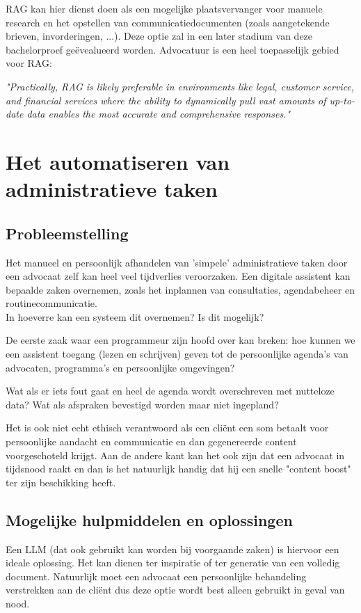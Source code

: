 RAG kan hier dienst doen als een mogelijke plaatsvervanger voor manuele research en het opstellen van communicatiedocumenten (zoals aangetekende brieven, invorderingen, ...). Deze optie zal in
een later stadium van deze bachelorproef geëvealueerd worden. Advocatuur is een heel toepasselijk gebied voor RAG:

\begin{displayquote}
	\textit{"Practically, RAG is likely preferable in environments like
		legal, customer service, and financial services where the ability to
		dynamically pull vast amounts of up-to-date data enables the most accurate and comprehensive responses."} \autocite{MediumRAG}
\end{displayquote}

\section{Het automatiseren van administratieve taken}
\subsection{Probleemstelling}
Het manueel en persoonlijk afhandelen van 'simpele' administratieve taken door een advocaat zelf kan heel veel tijdverlies veroorzaken.
Een digitale assistent kan bepaalde zaken overnemen, zoals het inplannen van consultaties, agendabeheer en routinecommunicatie. \\
In hoeverre kan een systeem dit overnemen? Is dit mogelijk?

De eerste zaak waar een programmeur zijn hoofd over kan breken:
hoe kunnen we een assistent toegang (lezen en schrijven) geven tot de persoonlijke agenda's van advocaten, programma's en persoonlijke omgevingen?

Wat als er iets fout gaat en heel de agenda wordt overschreven met nutteloze data?
Wat als afspraken bevestigd worden maar niet ingepland?

Het is ook niet echt ethisch verantwoord als een cliënt een som betaalt voor persoonlijke aandacht en communicatie en dan gegenereerde content voorgeschoteld krijgt.
Aan de andere kant kan het ook zijn dat een advocaat in tijdsnood raakt en dan is het natuurlijk handig dat hij een snelle "content boost" ter zijn beschikking heeft.

\subsection{Mogelijke hulpmiddelen en oplossingen}
Een LLM (dat ook gebruikt kan worden bij voorgaande zaken) is hiervoor een ideale oplossing.
Het kan dienen ter inspiratie of ter generatie van een volledig document.
Natuurlijk moet een advocaat een persoonlijke behandeling verstrekken aan de cliënt dus deze optie wordt best alleen gebruikt in geval van nood.

